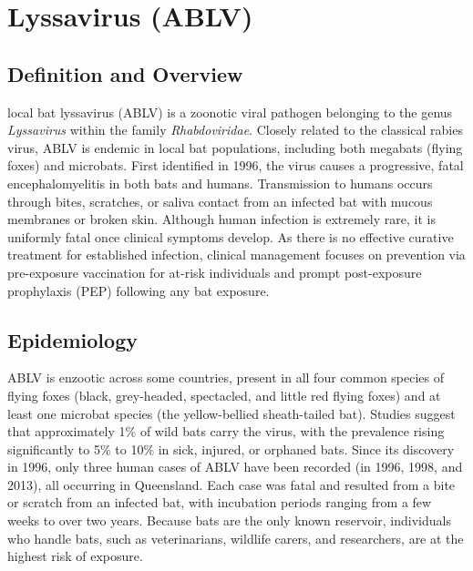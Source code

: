 \chapter{Lyssavirus (ABLV)}

\section*{Definition and Overview}
local bat lyssavirus (ABLV) is a zoonotic viral pathogen belonging to the genus \textit{Lyssavirus} within the family \textit{Rhabdoviridae}. Closely related to the classical rabies virus, ABLV is endemic in local bat populations, including both megabats (flying foxes) and microbats. First identified in 1996, the virus causes a progressive, fatal encephalomyelitis in both bats and humans. Transmission to humans occurs through bites, scratches, or saliva contact from an infected bat with mucous membranes or broken skin. Although human infection is extremely rare, it is uniformly fatal once clinical symptoms develop. As there is no effective curative treatment for established infection, clinical management focuses on prevention via pre-exposure vaccination for at-risk individuals and prompt post-exposure prophylaxis (PEP) following any bat exposure.

\section*{Epidemiology}
ABLV is enzootic across some countries, present in all four common species of flying foxes (black, grey-headed, spectacled, and little red flying foxes) and at least one microbat species (the yellow-bellied sheath-tailed bat). Studies suggest that approximately 1\% of wild bats carry the virus, with the prevalence rising significantly to 5\% to 10\% in sick, injured, or orphaned bats. Since its discovery in 1996, only three human cases of ABLV have been recorded (in 1996, 1998, and 2013), all occurring in Queensland. Each case was fatal and resulted from a bite or scratch from an infected bat, with incubation periods ranging from a few weeks to over two years. Because bats are the only known reservoir, individuals who handle bats, such as veterinarians, wildlife carers, and researchers, are at the highest risk of exposure.

